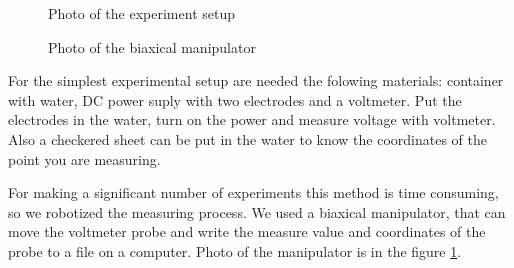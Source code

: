 \documentclass{article}
\begin{document}
\begin{figure}[h]
\begin{center}
\begin{minipage}[h]{0.47\linewidth}
\caption{Photo of the experiment setup}
\label{fig:mesh1}
\end{minipage}
\hfill
\begin{minipage}[h]{0.47\linewidth}
\caption{Photo of the biaxical manipulator}
\label{fig:mesh2}
\end{minipage}
\end{center}
\end{figure}

For the simplest experimental setup are needed the folowing materials: container with water, DC power suply with two electrodes and a voltmeter. Put the electrodes in the water, turn on the power and measure voltage with voltmeter. Also a checkered sheet can be put in the water to know the coordinates of the point you are measuring.\par

For making a significant number of experiments this method is time consuming, so we robotized the measuring process. We used a biaxical manipulator, that can move the voltmeter probe and write the measure value and coordinates of the probe to a file on a computer. Photo of the manipulator is in the figure \ref{fig:mesh2}.\par
\end{document}
